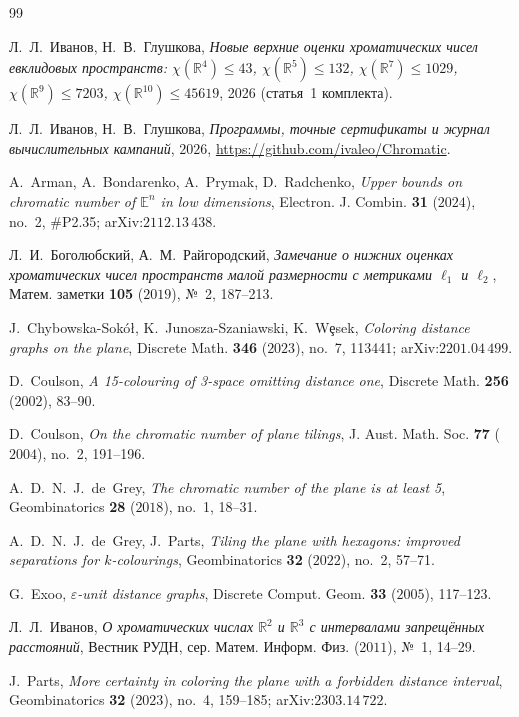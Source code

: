 \documentclass[11pt]{article}
\theoremstyle{definition}
\theoremstyle{remark}
\newcommand{\R}{\mathbb{R}}
\newcommand{\E}{\mathbb{E}}
\begin{document}
\begin{thebibliography}{99}\small

 Л.~Л.~Иванов, Н.~В.~Глушкова,
\emph{Новые верхние оценки хроматических чисел евклидовых пространств:
$\chi(\R^4)\le43$, $\chi(\R^5)\le132$, $\chi(\R^7)\le1029$,
$\chi(\R^9)\le7203$, $\chi(\R^{10})\le45619$}, 2026 (статья~1 комплекта).

 Л.~Л.~Иванов, Н.~В.~Глушкова,
\emph{Программы, точные сертификаты и журнал вычислительных кампаний},
$2026$, \url{https://github.com/ivaleo/Chromatic}.

 A.~Arman, A.~Bondarenko, A.~Prymak, D.~Radchenko,
\emph{Upper bounds on chromatic number of $\E^n$ in low dimensions},
Electron. J. Combin. \textbf{31} ($2024$), no.~2, \#P2.35; arXiv:$2112$.$13\,438$.

 Л.~И.~Боголюбский, А.~М.~Райгородский,
\emph{Замечание о нижних оценках хроматических чисел пространств малой
размерности с метриками $\ell_1$ и $\ell_2$}, Матем. заметки \textbf{105}
($2019$), №~2, 187--213.

 J.~Chybowska-Sok\'o\l{}, K.~Junosza-Szaniawski, K.~W\c{e}sek,
\emph{Coloring distance graphs on the plane},
Discrete Math. \textbf{346} ($2023$), no.~7, 113441;
arXiv:$2201$.$04\,499$.

 D.~Coulson,
\emph{A 15-colouring of 3-space omitting distance one},
Discrete Math. \textbf{256} ($2002$), 83--90.

 D.~Coulson,
\emph{On the chromatic number of plane tilings},
J. Aust. Math. Soc. \textbf{77} ($2004$), no.~2, 191--196.

 A.~D.~N.~J.~de~Grey,
\emph{The chromatic number of the plane is at least 5},
Geombinatorics \textbf{28} ($2018$), no.~1, 18--31.

 A.~D.~N.~J.~de~Grey, J.~Parts,
\emph{Tiling the plane with hexagons: improved separations for
$k$-colourings},
Geombinatorics \textbf{32} ($2022$), no.~2, 57--71.

 G.~Exoo,
\emph{$\varepsilon$-unit distance graphs},
Discrete Comput. Geom. \textbf{33} ($2005$), 117--123.

 Л.~Л.~Иванов,
\emph{О хроматических числах $\R^2$ и $\R^3$ с интервалами запрещённых
расстояний}, Вестник РУДН, сер. Матем. Информ. Физ. ($2011$), №~1, 14--29.

 J.~Parts,
\emph{More certainty in coloring the plane with a forbidden distance
interval},
Geombinatorics \textbf{32} ($2023$), no.~4, 159--185; arXiv:$2303$.$14\,722$.


\end{thebibliography}
\end{document}
